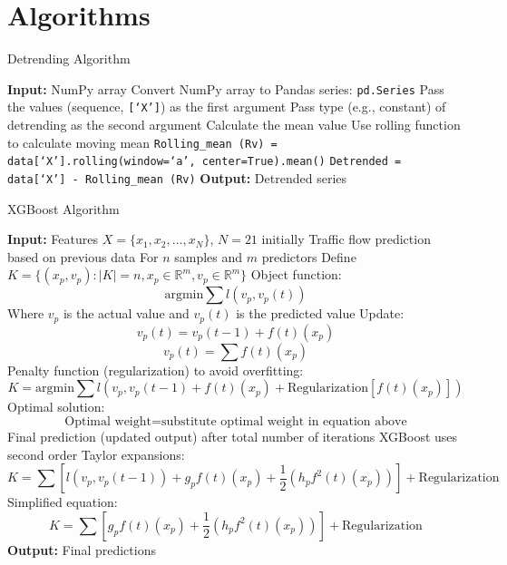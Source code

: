 \documentclass{article}
\begin{document}
\section*{Algorithms}

\begin{algorithm}
\caption{Detrending Algorithm}
\begin{algorithmic}[1]
\STATE \textbf{Input:} NumPy array
\STATE Convert NumPy array to Pandas series: \texttt{pd.Series}
\STATE Pass the values (sequence, \texttt{[‘X’]}) as the first argument
\STATE Pass type (e.g., constant) of detrending as the second argument
\STATE Calculate the mean value
\STATE Use rolling function to calculate moving mean
\STATE \texttt{Rolling\_mean (Rv) = data[‘X’].rolling(window=‘a’, center=True).mean()}
\STATE \texttt{Detrended = data[‘X’] - Rolling\_mean (Rv)}
\STATE \textbf{Output:} Detrended series
\end{algorithmic}
\end{algorithm}

\begin{algorithm}
\caption{XGBoost Algorithm}
\begin{algorithmic}[1]
\STATE \textbf{Input:} Features \( X = \{x_1, x_2, \ldots, x_N\} \), \( N = 21 \) initially
\STATE Traffic flow prediction based on previous data
\STATE For \( n \) samples and \( m \) predictors
\STATE Define \( K = \{(x_p, v_p) : |K| = n, x_p \in \mathbb{R}^m, v_p \in \mathbb{R}^m\} \)
\STATE Object function:
\[
\text{argmin} \sum l(v_p, v_p(t))
\]
\STATE Where \( v_p \) is the actual value and \( v_p(t) \) is the predicted value
\STATE Update:
\[
v_p(t) = v_p(t-1) + f(t)(x_p)
\]
\[
v_p(t) = \sum f(t)(x_p)
\]
\STATE Penalty function (regularization) to avoid overfitting:
\[
K = \text{argmin} \sum l(v_p, v_p(t-1) + f(t)(x_p) + \text{Regularization}[f(t)(x_p)])
\]
\STATE Optimal solution:
\[
\text{Optimal weight} = \text{substitute optimal weight in equation above}
\]
\STATE Final prediction (updated output) after total number of iterations
\STATE XGBoost uses second order Taylor expansions:
\[
K = \sum [l(v_p, v_p(t-1)) + g_p f(t)(x_p) + \frac{1}{2} (h_p f^2(t)(x_p))] + \text{Regularization}
\]
\STATE Simplified equation:
\[
K = \sum [g_p f(t)(x_p) + \frac{1}{2} (h_p f^2(t)(x_p))] + \text{Regularization}
\]
\STATE \textbf{Output:} Final predictions
\end{algorithmic}
\end{algorithm}
\end{document}
